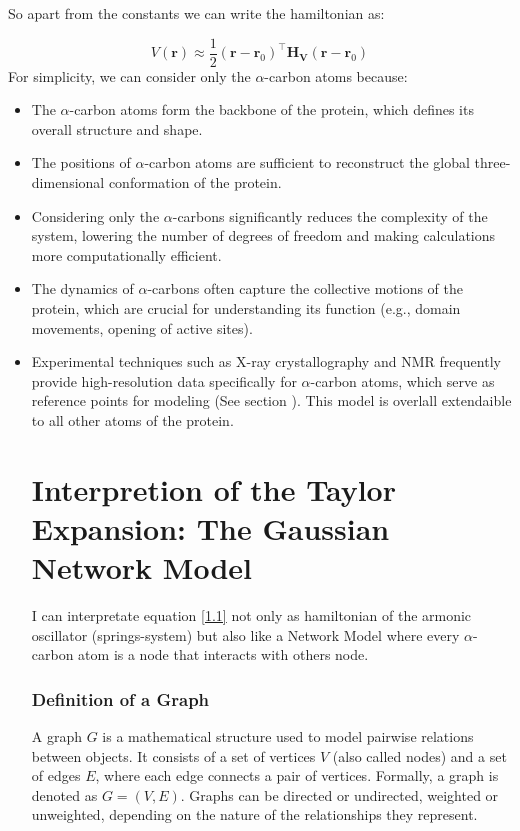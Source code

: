 \documentclass[English, Lau, oneside]{sapthesis}
\begin{document}
So apart from the constants we can write the hamiltonian as:

\begin{equation}
	V(\mathbf{r}) \approx\frac{1}{2} (\mathbf{r} - \mathbf{r}_0)^\top \mathbf{H_V} (\mathbf{r} - \mathbf{r}_0) \label{1.1}
\end{equation}
For simplicity, we can consider only the \(\alpha\)-carbon atoms because:

\begin{itemize}
    \item The \(\alpha\)-carbon atoms form the backbone of the protein, which defines its overall structure and shape.
    \item The positions of \(\alpha\)-carbon atoms are sufficient to reconstruct the global three-dimensional conformation of the protein.
    \item Considering only the \(\alpha\)-carbons significantly reduces the complexity of the system, lowering the number of degrees of freedom and making calculations more computationally efficient.
    \item The dynamics of \(\alpha\)-carbons often capture the collective motions of the protein, which are crucial for understanding its function (e.g., domain movements, opening of active sites).
    \item Experimental techniques such as X-ray crystallography and NMR frequently provide high-resolution data specifically for \(\alpha\)-carbon atoms, which serve as reference points for modeling (See section ).
This model is overlall extendaible to all other atoms of the protein.
\section{Interpretion of the Taylor Expansion: The Gaussian Network Model}
I can interpretate equation \eqref{1.1} not only as hamiltonian of the armonic oscillator  (springs-system) but also like a Network Model where every \(\alpha\)-carbon atom is a node that interacts with others node.
\subsubsection{Definition of a Graph}
A graph \( G \) is a mathematical structure used to model pairwise relations between objects. It consists of a set of vertices \( V \) (also called nodes) and a set of edges \( E \), where each edge connects a pair of vertices. Formally, a graph is denoted as \( G = (V, E) \). Graphs can be directed or undirected, weighted or unweighted, depending on the nature of the relationships they represent.


\end{itemize}
\end{document}
